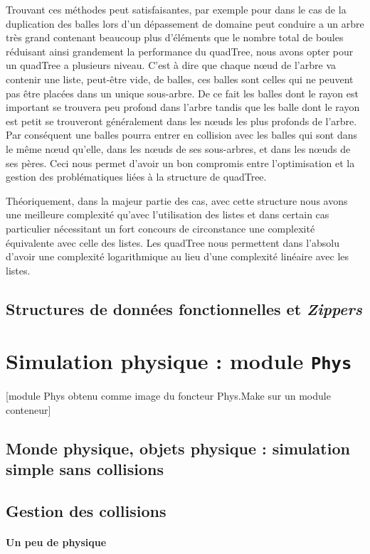 \documentclass[a4paper]{scrartcl}
\begin{document}
Trouvant ces méthodes peut satisfaisantes, par exemple pour dans le
cas de la duplication des balles lors d'un dépassement de domaine peut
conduire a un arbre très grand contenant beaucoup plus d'éléments que
le nombre total de boules réduisant ainsi grandement la performance du
quadTree, nous avons opter pour un quadTree a plusieurs niveau. C'est
à dire que chaque nœud de l'arbre va contenir une liste, peut-être
vide, de balles, ces balles sont celles qui ne peuvent pas être
placées dans un unique sous-arbre. De ce fait les balles dont le rayon
est important se trouvera peu profond dans l'arbre tandis que les
balle dont le rayon est petit se trouveront généralement dans les
nœuds les plus profonds de l'arbre. Par conséquent une balles pourra
entrer en collision avec les balles qui sont dans le même nœud
qu'elle, dans les nœuds de ses sous-arbres, et dans les nœuds de ses
pères. Ceci nous permet d'avoir un bon compromis entre l'optimisation
et la gestion des problématiques liées à la structure de quadTree.

Théoriquement, dans la majeur partie des cas, avec cette structure
nous avons une meilleure complexité qu'avec l'utilisation des listes
et dans certain cas particulier nécessitant un fort concours de
circonstance une complexité équivalente avec celle des listes. Les
quadTree nous permettent dans l'absolu d'avoir une complexité
logarithmique au lieu d'une complexité linéaire avec les listes.

\subsection{Structures de données fonctionnelles et \emph{Zippers}}


\section{Simulation physique : module \texttt{Phys}}
[module Phys obtenu comme image du foncteur Phys.Make sur un module
conteneur]
\subsection{Monde physique, objets physique : simulation simple sans
  collisions}
\subsection{Gestion des collisions}
\paragraph{Un peu de physique}
\end{document}

